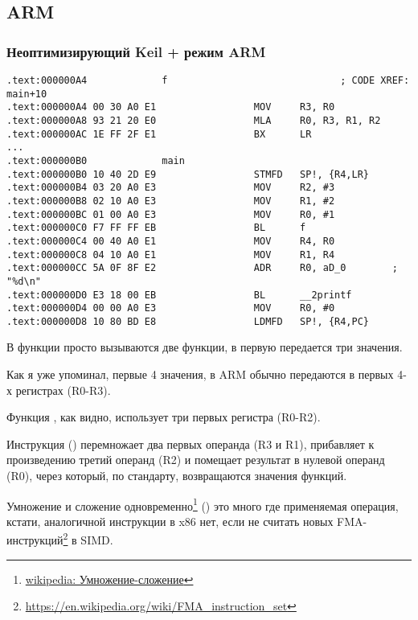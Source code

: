 ﻿%
\subsection{ARM}

\subsubsection{Неоптимизирующий Keil + режим ARM}

\begin{lstlisting}
.text:000000A4             f                              ; CODE XREF: main+10
.text:000000A4 00 30 A0 E1                 MOV     R3, R0
.text:000000A8 93 21 20 E0                 MLA     R0, R3, R1, R2
.text:000000AC 1E FF 2F E1                 BX      LR
...
.text:000000B0             main
.text:000000B0 10 40 2D E9                 STMFD   SP!, {R4,LR}
.text:000000B4 03 20 A0 E3                 MOV     R2, #3
.text:000000B8 02 10 A0 E3                 MOV     R1, #2
.text:000000BC 01 00 A0 E3                 MOV     R0, #1
.text:000000C0 F7 FF FF EB                 BL      f
.text:000000C4 00 40 A0 E1                 MOV     R4, R0
.text:000000C8 04 10 A0 E1                 MOV     R1, R4
.text:000000CC 5A 0F 8F E2                 ADR     R0, aD_0        ; "%d\n"
.text:000000D0 E3 18 00 EB                 BL      __2printf
.text:000000D4 00 00 A0 E3                 MOV     R0, #0
.text:000000D8 10 80 BD E8                 LDMFD   SP!, {R4,PC}
\end{lstlisting}

В функции \main просто вызываются две функции, в первую передается три значения.

Как я уже упоминал, первые 4 значения, в ARM обычно передаются в первых 4-х регистрах (R0-R3).

Функция , как видно, использует три первых регистра (R0-R2).

Инструкция  () перемножает два первых операнда (R3 и R1), прибавляет к произведению
третий операнд (R2) и помещает результат в нулевой операнд (R0), через который, по стандарту, возвращаются
значения функций.

Умножение и сложение одновременно\footnote{\href{https://ru.wikipedia.org/wiki/\%D0\%A3\%D0\%BC\%D0\%BD\%D0\%BE\%D0\%B6\%D0\%B5\%D0\%BD\%D0\%B8\%D0\%B5-\%D1\%81\%D0\%BB\%D0\%BE\%D0\%B6\%D0\%B5\%D0\%BD\%D0\%B8\%D0\%B5}{wikipedia: Умножение-сложение}} () это много где применяемая операция, кстати, аналогичной
инструкции в x86 нет, если не считать новых 
FMA-инструкций\footnote{\url{https://en.wikipedia.org/wiki/FMA_instruction_set}} в SIMD.

